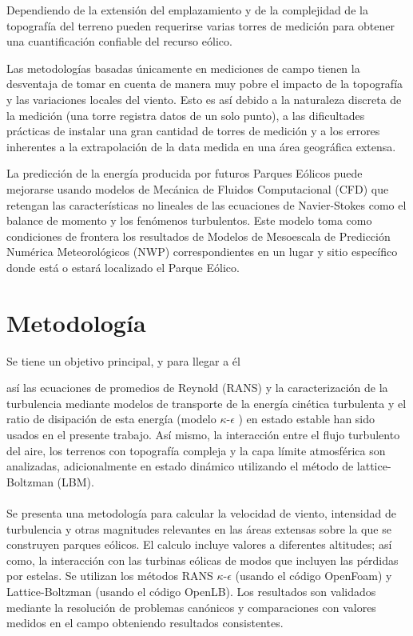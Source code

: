 Dependiendo de la extensión del emplazamiento y de la complejidad de la topografía del terreno pueden requerirse varias torres de medición para obtener una cuantificación confiable del recurso eólico. 

Las metodologías basadas únicamente en mediciones de campo tienen la desventaja de tomar en cuenta de manera muy pobre el impacto de la topografía y las variaciones locales del viento. Esto es así debido a la naturaleza discreta de la medición (una torre registra datos de un solo punto), a las dificultades prácticas de instalar una gran cantidad de torres de medición y a los errores inherentes a la extrapolación de la data medida en una área geográfica extensa.

La predicción de la energía producida por futuros Parques Eólicos puede mejorarse usando modelos de Mecánica de Fluidos Computacional (CFD) que retengan las características no lineales de las ecuaciones de Navier-Stokes como el balance de momento y los fenómenos turbulentos. Este modelo toma como condiciones de frontera los resultados de Modelos de Mesoescala de Predicción Numérica  Meteorológicos (NWP) correspondientes en un lugar y sitio específico donde está o estará localizado el Parque Eólico. 


\section{Metodología}

Se tiene un objetivo principal, y para llegar a \'el %


así las ecuaciones de promedios de Reynold (RANS) y la caracterización de la  turbulencia mediante modelos de transporte de la energía cinética turbulenta y el ratio de disipación de esta energía (modelo $\kappa$-$\epsilon$ ) en estado estable han sido usados en el presente trabajo. Así mismo, la interacción entre el flujo turbulento del aire, los terrenos con topografía compleja y la capa límite atmosférica son analizadas, adicionalmente en estado dinámico utilizando el método de lattice-Boltzman (LBM).
\\
\\
\hspace*{1em}Se presenta una metodología para calcular la velocidad de viento, intensidad de turbulencia y otras magnitudes relevantes en las áreas extensas sobre la que se construyen parques eólicos. El calculo incluye valores a diferentes altitudes; así como, la interacción con las turbinas eólicas de modos que incluyen las pérdidas por estelas. Se utilizan los métodos RANS $\kappa$-$\epsilon$ (usando el código OpenFoam) y Lattice-Boltzman (usando el código OpenLB). Los resultados son validados mediante la resolución de problemas canónicos y comparaciones con valores medidos en el campo obteniendo resultados consistentes.

